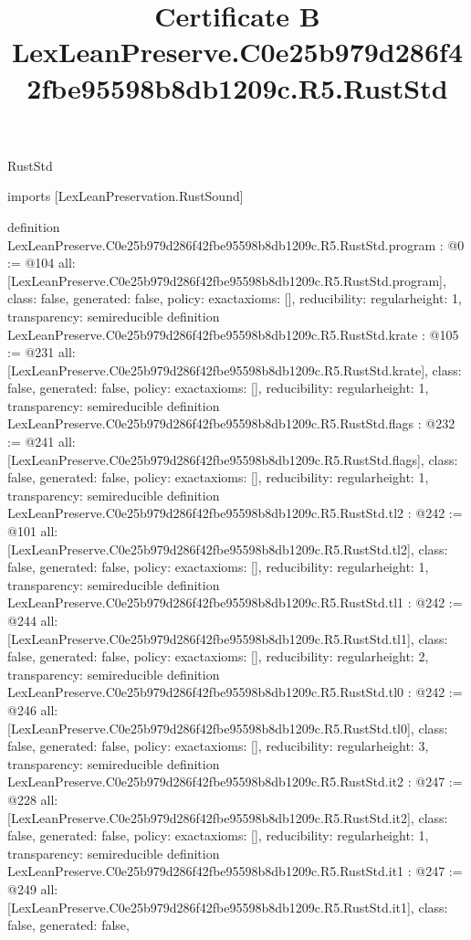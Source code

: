 \begin{lexlean}{RustStd}
\title{Certificate B LexLeanPreserve.C0e25b979d286f42fbe95598b8db1209c.R5.RustStd}
\begin{coremodule}
imports [LexLeanPreservation.RustSound]

definition LexLeanPreserve.C0e25b979d286f42fbe95598b8db1209c.R5.RustStd.program : @0 := @104 {
  all: [LexLeanPreserve.C0e25b979d286f42fbe95598b8db1209c.R5.RustStd.program],
  class: false,
  generated: false,
  policy: exact{axioms: []},
  reducibility: regular{height: 1},
  transparency: semireducible
}
definition LexLeanPreserve.C0e25b979d286f42fbe95598b8db1209c.R5.RustStd.krate : @105 := @231 {
  all: [LexLeanPreserve.C0e25b979d286f42fbe95598b8db1209c.R5.RustStd.krate],
  class: false,
  generated: false,
  policy: exact{axioms: []},
  reducibility: regular{height: 1},
  transparency: semireducible
}
definition LexLeanPreserve.C0e25b979d286f42fbe95598b8db1209c.R5.RustStd.flags : @232 := @241 {
  all: [LexLeanPreserve.C0e25b979d286f42fbe95598b8db1209c.R5.RustStd.flags],
  class: false,
  generated: false,
  policy: exact{axioms: []},
  reducibility: regular{height: 1},
  transparency: semireducible
}
definition LexLeanPreserve.C0e25b979d286f42fbe95598b8db1209c.R5.RustStd.tl2 : @242 := @101 {
  all: [LexLeanPreserve.C0e25b979d286f42fbe95598b8db1209c.R5.RustStd.tl2],
  class: false,
  generated: false,
  policy: exact{axioms: []},
  reducibility: regular{height: 1},
  transparency: semireducible
}
definition LexLeanPreserve.C0e25b979d286f42fbe95598b8db1209c.R5.RustStd.tl1 : @242 := @244 {
  all: [LexLeanPreserve.C0e25b979d286f42fbe95598b8db1209c.R5.RustStd.tl1],
  class: false,
  generated: false,
  policy: exact{axioms: []},
  reducibility: regular{height: 2},
  transparency: semireducible
}
definition LexLeanPreserve.C0e25b979d286f42fbe95598b8db1209c.R5.RustStd.tl0 : @242 := @246 {
  all: [LexLeanPreserve.C0e25b979d286f42fbe95598b8db1209c.R5.RustStd.tl0],
  class: false,
  generated: false,
  policy: exact{axioms: []},
  reducibility: regular{height: 3},
  transparency: semireducible
}
definition LexLeanPreserve.C0e25b979d286f42fbe95598b8db1209c.R5.RustStd.it2 : @247 := @228 {
  all: [LexLeanPreserve.C0e25b979d286f42fbe95598b8db1209c.R5.RustStd.it2],
  class: false,
  generated: false,
  policy: exact{axioms: []},
  reducibility: regular{height: 1},
  transparency: semireducible
}
definition LexLeanPreserve.C0e25b979d286f42fbe95598b8db1209c.R5.RustStd.it1 : @247 := @249 {
  all: [LexLeanPreserve.C0e25b979d286f42fbe95598b8db1209c.R5.RustStd.it1],
  class: false,
  generated: false,
}
\end{coremodule}
\end{lexlean}
